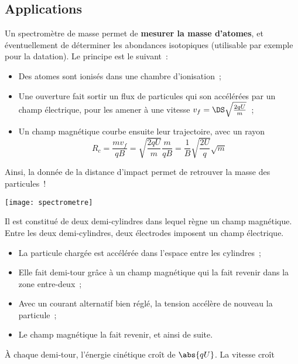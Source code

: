 \documentclass[../main/main.tex]{subfiles}
\begin{document}
\subsection{Applications}
\begin{itemize}[label=$\diamond$]
     Un spectromètre de masse permet de
        \textbf{mesurer la masse d'atomes}, et éventuellement de déterminer les
        abondances isotopiques (utilisable par exemple pour la datation). Le
        principe est le suivant~:
        \begin{itemize}
            \item Des atomes sont ionisés dans une chambre d'ionisation~;
            \item Une ouverture fait sortir un flux de particules qui son
                accélérées par un champ électrique, pour les amener à une
                vitesse $v_f = \DS \sqrt{\frac{2qU}{m}}$~;
            \item Un champ magnétique courbe ensuite leur trajectoire, avec un
                rayon
                \[R_c = \frac{mv_f}{qB} = \sqrt{\frac{2qU}{m}}\frac{m}{qB} =
                \frac{1}{B} \sqrt{\frac{2U}{q}}\sqrt{m}\]
        \end{itemize}
        Ainsi, la donnée de la distance d'impact permet de retrouver la masse
        des particules~! \bigbreak
        \begin{center}
            \texttt{[image: spectrometre]}
            \label{fig:spectrometre}
        \end{center}
     Il est constitué de deux demi-cylindres dans lequel
        règne un champ magnétique. Entre les deux demi-cylindres, deux
        électrodes imposent un champ électrique.
        \begin{itemize}
            \item La particule chargée est accélérée dans l'espace entre les
                cylindres~;
            \item Elle fait demi-tour grâce à un champ magnétique qui la fait
                revenir dans la zone entre-deux~;
            \item Avec un courant alternatif bien réglé, la tension accélère de
                nouveau la particule~;
            \item Le champ magnétique la fait revenir, et ainsi de suite.
        \end{itemize}
        À chaque demi-tour, l'énergie cinétique croît de $\abs{qU}$. La vitesse croît

\end{itemize}
\end{document}
